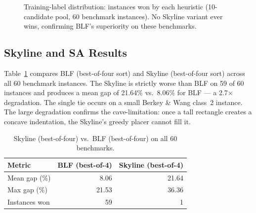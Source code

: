 \documentclass[11pt,a4paper]{article}
\begin{document}
\begin{figure}[h]
\centering
{}
\caption{Training-label distribution: instances won by each heuristic
         (10-candidate pool, 60 benchmark instances).
         No Skyline variant ever wins, confirming BLF's superiority on
         these benchmarks.}
\label{fig:ml_pie}
\end{figure}

\subsection{Skyline and SA Results}
\label{sec:sky_sa}

Table~\ref{tab:sky_blf} compares BLF (best-of-four sort) and Skyline
(best-of-four sort) across all 60 benchmark instances.
The Skyline is strictly worse than BLF on 59 of 60 instances and produces a
mean gap of 21.64\% vs.\ 8.06\% for BLF — a 2.7$\times$ degradation.
The single tie occurs on a small Berkey \& Wang class~2 instance.
The large degradation confirms the cave-limitation: once a tall rectangle
creates a concave indentation, the Skyline's greedy placer cannot fill it.

\begin{table}[h]
\centering
\caption{Skyline (best-of-four) vs.\ BLF (best-of-four) on all 60 benchmarks.}
\label{tab:sky_blf}
\begin{tabular}{lrr}
\toprule
Metric & BLF (best-of-4) & Skyline (best-of-4) \\
\midrule
Mean gap (\%)     & \phantom{0}8.06 & 21.64 \\
Max gap (\%)      & 21.53           & 36.36 \\
Instances won     & 59              & \phantom{0}1 \\
\bottomrule
\end{tabular}
\end{table}
\end{document}
